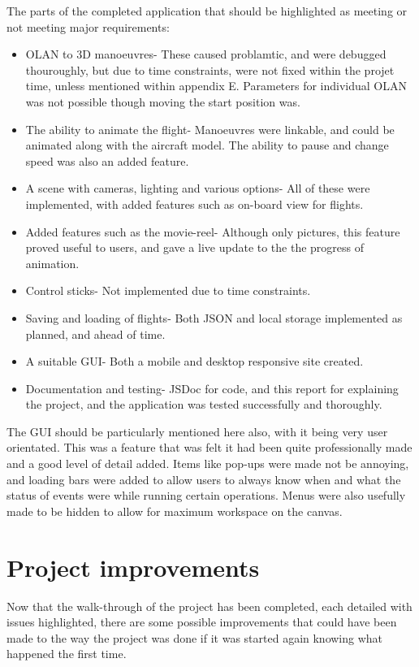 The parts of the completed application that should be highlighted as meeting or not meeting major requirements:
\begin{itemize}
	\item OLAN to 3D manoeuvres- These caused problamtic, and were debugged thouroughly, but due to time constraints, were not fixed within the projet time, unless mentioned within appendix E. Parameters for individual OLAN was not possible though moving the start position was.
	\item The ability to animate the flight- Manoeuvres were linkable, and could be animated along with the aircraft model. The ability to pause and change speed was also an added feature.
	\item A scene with cameras, lighting and various options- All of these were implemented, with added features such as on-board view for flights.
	\item Added features such as the movie-reel- Although only pictures, this feature proved useful to users, and gave a live update to the the progress of animation.
	\item Control sticks- Not implemented due to time constraints.
	\item Saving and loading of flights- Both JSON and local storage implemented as planned, and ahead of time.
	\item A suitable GUI- Both a mobile and desktop responsive site created.
	\item Documentation and testing- JSDoc for code, and this report for explaining the project, and the application was tested successfully and thoroughly.
\end{itemize}

The GUI should be particularly mentioned here also, with it being very user orientated. This was a feature that was felt it had been quite professionally made and a good level of detail added. Items like pop-ups were made not be annoying, and loading bars were added to allow users to always know when and what the status of events were while running certain operations. Menus were also usefully made to be hidden to allow for maximum workspace on the canvas.

\section{Project improvements}
Now that the walk-through of the project has been completed, each detailed with issues highlighted, there are some possible improvements that could have been made to the way the project was done if it was started again knowing what happened the first time.

